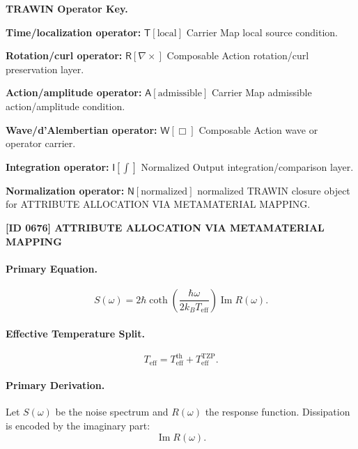 \par\vspace{0.45\baselineskip}
\noindent\begin{minipage}[t]{\linewidth}
\begingroup
\small
\raggedright
\textbf{TRAWIN Operator Key.}\par
\noindent\textbf{Time/localization operator:} $\mathsf{T}\!\left[\mathrm{local}\right]$ Carrier Map local source condition.\par
\noindent\textbf{Rotation/curl operator:} $\mathsf{R}\!\left[\nabla\times\right]$ Composable Action rotation/curl preservation layer.\par
\noindent\textbf{Action/amplitude operator:} $\mathsf{A}\!\left[\mathrm{admissible}\right]$ Carrier Map admissible action/amplitude condition.\par
\noindent\textbf{Wave/d'Alembertian operator:} $\mathsf{W}\!\left[\Box\right]$ Composable Action wave or operator carrier.\par
\noindent\textbf{Integration operator:} $\mathsf{I}\!\left[\int\right]$ Normalized Output integration/comparison layer.\par
\noindent\textbf{Normalization operator:} $\mathsf{N}\!\left[\mathrm{normalized}\right]$ normalized TRAWIN closure object for ATTRIBUTE ALLOCATION VIA METAMATERIAL MAPPING.\par
\endgroup
\end{minipage}

\clearpage
\noindent\textbf{[ID 0676] ATTRIBUTE ALLOCATION VIA METAMATERIAL MAPPING}\par
\vspace{0.35em}
\paragraph{Primary Equation.}
\begin{equation}
S(\omega)
=
2\hbar
\coth\left(
\frac{\hbar\omega}{2k_B T_{\mathrm{eff}}}
\right)
\operatorname{Im}R(\omega).
\end{equation}

\paragraph{Effective Temperature Split.}
\begin{equation}
T_{\mathrm{eff}}
=
T_{\mathrm{eff}}^{\mathrm{th}}
+
T_{\mathrm{eff}}^{\mathrm{TZP}} .
\end{equation}

\paragraph{Primary Derivation.}
Let $S(\omega)$ be the noise spectrum and $R(\omega)$ the response function.  
Dissipation is encoded by the imaginary part:
\begin{equation}
\operatorname{Im}R(\omega).
\end{equation}

